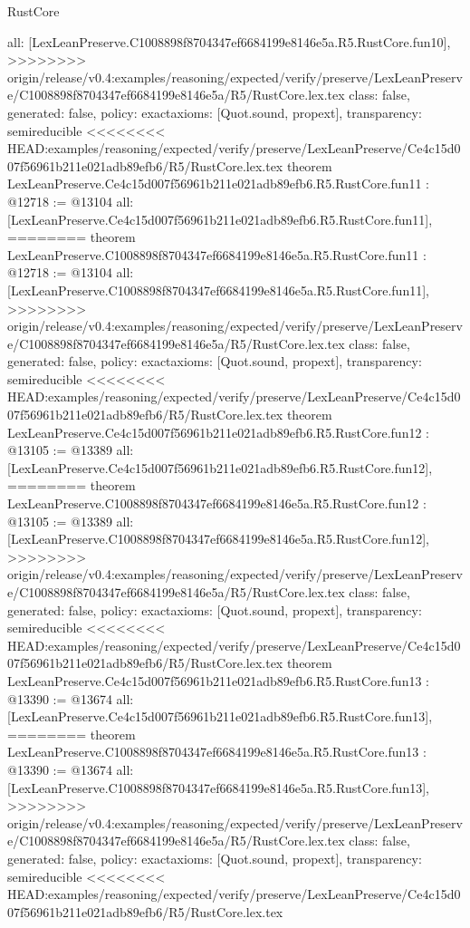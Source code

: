 \begin{lexlean}{RustCore}
\begin{coremodule}
{\begin{coremodule}
{{{{{{{{{{{{{{  all: [LexLeanPreserve.C1008898f8704347ef6684199e8146e5a.R5.RustCore.fun10],
>>>>>>>> origin/release/v0.4:examples/reasoning/expected/verify/preserve/LexLeanPreserve/C1008898f8704347ef6684199e8146e5a/R5/RustCore.lex.tex
  class: false,
  generated: false,
  policy: exact{axioms: [Quot.sound, propext]},
  transparency: semireducible
}
<<<<<<<< HEAD:examples/reasoning/expected/verify/preserve/LexLeanPreserve/Ce4c15d007f56961b211e021adb89efb6/R5/RustCore.lex.tex
theorem LexLeanPreserve.Ce4c15d007f56961b211e021adb89efb6.R5.RustCore.fun11 : @12718 := @13104 {
  all: [LexLeanPreserve.Ce4c15d007f56961b211e021adb89efb6.R5.RustCore.fun11],
========
theorem LexLeanPreserve.C1008898f8704347ef6684199e8146e5a.R5.RustCore.fun11 : @12718 := @13104 {
  all: [LexLeanPreserve.C1008898f8704347ef6684199e8146e5a.R5.RustCore.fun11],
>>>>>>>> origin/release/v0.4:examples/reasoning/expected/verify/preserve/LexLeanPreserve/C1008898f8704347ef6684199e8146e5a/R5/RustCore.lex.tex
  class: false,
  generated: false,
  policy: exact{axioms: [Quot.sound, propext]},
  transparency: semireducible
}
<<<<<<<< HEAD:examples/reasoning/expected/verify/preserve/LexLeanPreserve/Ce4c15d007f56961b211e021adb89efb6/R5/RustCore.lex.tex
theorem LexLeanPreserve.Ce4c15d007f56961b211e021adb89efb6.R5.RustCore.fun12 : @13105 := @13389 {
  all: [LexLeanPreserve.Ce4c15d007f56961b211e021adb89efb6.R5.RustCore.fun12],
========
theorem LexLeanPreserve.C1008898f8704347ef6684199e8146e5a.R5.RustCore.fun12 : @13105 := @13389 {
  all: [LexLeanPreserve.C1008898f8704347ef6684199e8146e5a.R5.RustCore.fun12],
>>>>>>>> origin/release/v0.4:examples/reasoning/expected/verify/preserve/LexLeanPreserve/C1008898f8704347ef6684199e8146e5a/R5/RustCore.lex.tex
  class: false,
  generated: false,
  policy: exact{axioms: [Quot.sound, propext]},
  transparency: semireducible
}
<<<<<<<< HEAD:examples/reasoning/expected/verify/preserve/LexLeanPreserve/Ce4c15d007f56961b211e021adb89efb6/R5/RustCore.lex.tex
theorem LexLeanPreserve.Ce4c15d007f56961b211e021adb89efb6.R5.RustCore.fun13 : @13390 := @13674 {
  all: [LexLeanPreserve.Ce4c15d007f56961b211e021adb89efb6.R5.RustCore.fun13],
========
theorem LexLeanPreserve.C1008898f8704347ef6684199e8146e5a.R5.RustCore.fun13 : @13390 := @13674 {
  all: [LexLeanPreserve.C1008898f8704347ef6684199e8146e5a.R5.RustCore.fun13],
>>>>>>>> origin/release/v0.4:examples/reasoning/expected/verify/preserve/LexLeanPreserve/C1008898f8704347ef6684199e8146e5a/R5/RustCore.lex.tex
  class: false,
  generated: false,
  policy: exact{axioms: [Quot.sound, propext]},
  transparency: semireducible
}
<<<<<<<< HEAD:examples/reasoning/expected/verify/preserve/LexLeanPreserve/Ce4c15d007f56961b211e021adb89efb6/R5/RustCore.lex.tex
}}}}}}}}}}}}}}}}
\end{coremodule}}
\end{coremodule}
\end{lexlean}
